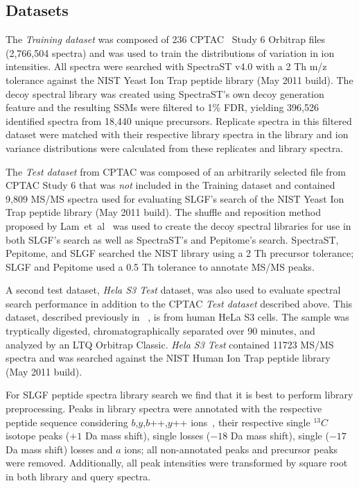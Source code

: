 \documentclass[endnotes,11pt]{article}
\begin{document}
\subsection*{Datasets}

The {\em Training dataset} was composed of 236 CPTAC~\cite{paulovich10,tabb10} Study 6 Orbitrap files (2,766,504 spectra) and was used to train the distributions of variation in ion intensities. All spectra were searched with SpectraST v4.0 with a 2 Th m/z tolerance against the NIST Yeast Ion Trap peptide library (May 2011 build). The decoy spectral library was created using SpectraST's own decoy generation feature and the resulting SSMs were filtered to 1\% FDR, yielding 396,526 identified spectra from 18,440 unique precursors. Replicate spectra in this filtered dataset were matched with their respective library spectra in the library and ion variance distributions were calculated from these replicates and library spectra.

The {\em Test dataset} from CPTAC was composed of an arbitrarily selected file from CPTAC Study 6 that was \emph{not} included in the Training dataset and contained 9,809 MS/MS spectra used for evaluating SLGF's search of the NIST Yeast Ion Trap peptide library (May 2011 build). The shuffle and reposition method proposed by Lam~et~al~\cite{lam10} was used to create the decoy spectral libraries for use in both SLGF's search as well as SpectraST's and Pepitome's search. SpectraST, Pepitome, and SLGF searched the NIST library using a 2 Th precursor tolerance; SLGF and Pepitome used a 0.5 Th tolerance to annotate MS/MS peaks.

A second test dataset, {\em Hela S3 Test} dataset, was also used to evaluate spectral search performance in addition to the CPTAC {\em Test dataset} described above. This dataset, described previously in ~\cite{rudomin09}, is from human HeLa S3 cells. The sample was tryptically digested, chromatographically separated over 90 minutes, and analyzed by an LTQ Orbitrap Classic. {\em Hela S3 Test} contained 11723 MS/MS spectra and was searched against the NIST Human Ion Trap peptide library (May 2011 build). 

For SLGF peptide spectra library search we find that it is best to perform library preprocessing. Peaks in library spectra were annotated with the respective peptide sequence considering $b$,$y$,$b$++,$y$++ ions~\cite{Roepstorff84}, their respective single $^{13}C$ isotope peaks ($+1$ Da mass shift), single  losses ($-18$ Da mass shift), single  ($-17$ Da mass shift) losses and $a$ ions; all non-annotated peaks and precursor peaks were removed. Additionally, all peak intensities were transformed by square root in both library and query spectra.
\end{document}
